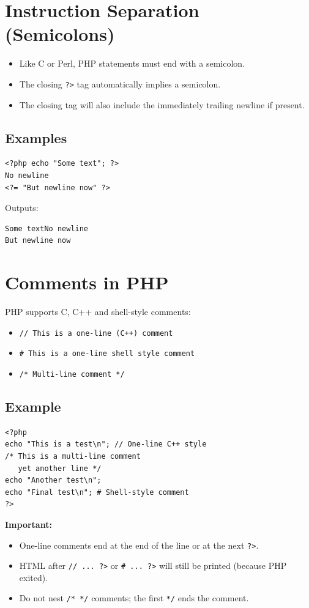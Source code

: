 \documentclass[12pt,a4paper]{article}
\begin{document}
\section{Instruction Separation (Semicolons)}
\begin{itemize}[left=1em]
  \item Like C or Perl, PHP statements must end with a semicolon.
  \item The closing \verb|?>| tag automatically implies a semicolon.
  \item The closing tag will also include the immediately trailing newline if present.
\end{itemize}

\subsection*{Examples}
\begin{verbatim}
<?php echo "Some text"; ?>
No newline
<?= "But newline now" ?>
\end{verbatim}

Outputs:
\begin{verbatim}
Some textNo newline
But newline now
\end{verbatim}

\section{Comments in PHP}
PHP supports C, C++ and shell-style comments:
\begin{itemize}[left=1em]
  \item \verb|// This is a one-line (C++) comment|
  \item \verb|# This is a one-line shell style comment|
  \item \verb|/* Multi-line comment */|
\end{itemize}

\subsection*{Example}
\begin{verbatim}
<?php
echo "This is a test\n"; // One-line C++ style
/* This is a multi-line comment
   yet another line */
echo "Another test\n";
echo "Final test\n"; # Shell-style comment
?>
\end{verbatim}

\textbf{Important:}
\begin{itemize}[left=1em]
  \item One-line comments end at the end of the line or at the next \verb|?>|.
  \item HTML after \verb|// ... ?>| or \verb|# ... ?>| will still be printed (because PHP exited).
  \item Do not nest \verb|/* */| comments; the first \verb|*/| ends the comment.
\end{itemize}
\end{document}
